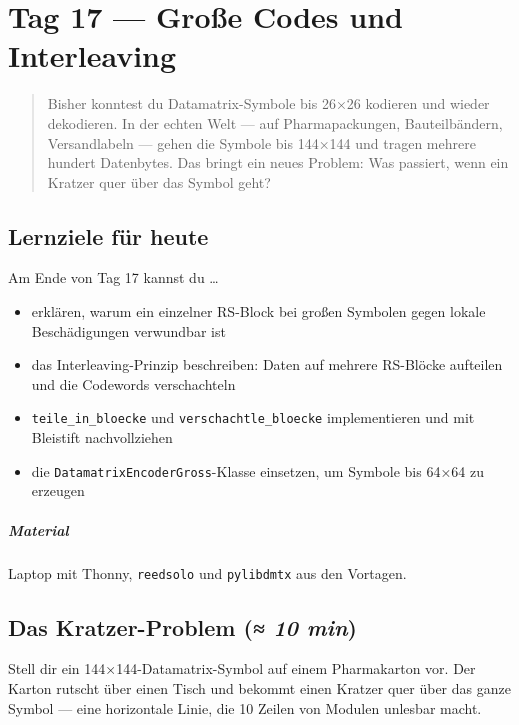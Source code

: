 \chapter{Tag 17 — Große Codes und Interleaving}

\begin{quote}
Bisher konntest du Datamatrix-Symbole bis 26×26 kodieren und wieder
dekodieren. In der echten Welt — auf Pharmapackungen, Bauteilbändern,
Versandlabeln — gehen die Symbole bis 144×144 und tragen mehrere hundert
Datenbytes. Das bringt ein neues Problem: Was passiert, wenn ein
Kratzer quer über das Symbol geht?
\end{quote}

\section*{Lernziele für heute}

Am Ende von Tag 17 kannst du \dots

\begin{itemize}
\item erklären, warum ein einzelner RS-Block bei großen Symbolen
  gegen lokale Beschädigungen verwundbar ist
\item das Interleaving-Prinzip beschreiben: Daten auf mehrere
  RS-Blöcke aufteilen und die Codewords verschachteln
\item \texttt{teile\_in\_bloecke} und \texttt{verschachtle\_bloecke}
  implementieren und mit Bleistift nachvollziehen
\item die \texttt{DatamatrixEncoderGross}-Klasse einsetzen, um
  Symbole bis 64×64 zu erzeugen
\end{itemize}

\paragraph{Material} Laptop mit Thonny, \texttt{reedsolo} und
\texttt{pylibdmtx} aus den Vortagen.

\section{Das Kratzer-Problem \normalfont(\textit{≈ 10 min})}

Stell dir ein 144×144-Datamatrix-Symbol auf einem Pharmakarton vor.
Der Karton rutscht über einen Tisch und bekommt einen Kratzer quer
über das ganze Symbol — eine horizontale Linie, die 10 Zeilen von
Modulen unlesbar macht.

